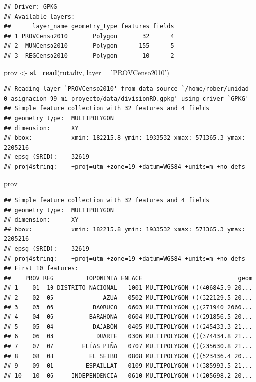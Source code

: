 \documentclass[11pt,]{article}
\newenvironment{Shaded}{\begin{snugshade}}{\end{snugshade}}
\newcommand{\KeywordTok}[1]{\textcolor[rgb]{0.13,0.29,0.53}{\textbf{#1}}}
\newcommand{\DataTypeTok}[1]{\textcolor[rgb]{0.13,0.29,0.53}{#1}}
\newcommand{\StringTok}[1]{\textcolor[rgb]{0.31,0.60,0.02}{#1}}
\newcommand{\NormalTok}[1]{#1}
\begin{document}
\begin{verbatim}
## Driver: GPKG 
## Available layers:
##      layer_name geometry_type features fields
## 1 PROVCenso2010       Polygon       32      4
## 2  MUNCenso2010       Polygon      155      5
## 3  REGCenso2010       Polygon       10      2
\end{verbatim}

\begin{Shaded}
\begin{Highlighting}[]
\NormalTok{prov <-}\StringTok{ }\KeywordTok{st_read}\NormalTok{(rutadiv, }\DataTypeTok{layer =} \StringTok{'PROVCenso2010'}\NormalTok{)}
\end{Highlighting}
\end{Shaded}

\begin{verbatim}
## Reading layer `PROVCenso2010' from data source `/home/rober/unidad-0-asignacion-99-mi-proyecto/data/divisionRD.gpkg' using driver `GPKG'
## Simple feature collection with 32 features and 4 fields
## geometry type:  MULTIPOLYGON
## dimension:      XY
## bbox:           xmin: 182215.8 ymin: 1933532 xmax: 571365.3 ymax: 2205216
## epsg (SRID):    32619
## proj4string:    +proj=utm +zone=19 +datum=WGS84 +units=m +no_defs
\end{verbatim}

\begin{Shaded}
\begin{Highlighting}[]
\NormalTok{prov}
\end{Highlighting}
\end{Shaded}

\begin{verbatim}
## Simple feature collection with 32 features and 4 fields
## geometry type:  MULTIPOLYGON
## dimension:      XY
## bbox:           xmin: 182215.8 ymin: 1933532 xmax: 571365.3 ymax: 2205216
## epsg (SRID):    32619
## proj4string:    +proj=utm +zone=19 +datum=WGS84 +units=m +no_defs
## First 10 features:
##    PROV REG         TOPONIMIA ENLACE                           geom
## 1    01  10 DISTRITO NACIONAL   1001 MULTIPOLYGON (((406845.9 20...
## 2    02  05              AZUA   0502 MULTIPOLYGON (((322129.5 20...
## 3    03  06           BAORUCO   0603 MULTIPOLYGON (((271940 2060...
## 4    04  06          BARAHONA   0604 MULTIPOLYGON (((291856.5 20...
## 5    05  04           DAJABÓN   0405 MULTIPOLYGON (((245433.3 21...
## 6    06  03            DUARTE   0306 MULTIPOLYGON (((374434.8 21...
## 7    07  07        ELÍAS PIÑA   0707 MULTIPOLYGON (((235630.8 21...
## 8    08  08          EL SEIBO   0808 MULTIPOLYGON (((523436.4 20...
## 9    09  01         ESPAILLAT   0109 MULTIPOLYGON (((385993.5 21...
## 10   10  06     INDEPENDENCIA   0610 MULTIPOLYGON (((205698.2 20...
\end{verbatim}
\end{document}
